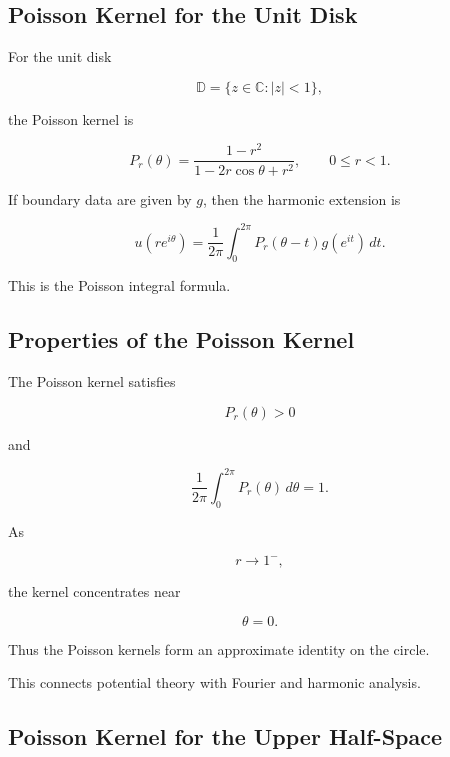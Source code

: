 \subsection{Poisson Kernel for the Unit Disk}
\label{subsec:poisson-kernel-disk}

For the unit disk

\[
\mathbb{D}
=
\{z\in\mathbb{C}:|z|<1\},
\]

the Poisson kernel is

\[
\boxed{
P_r(\theta)
=
\frac{1-r^2}
{1-2r\cos\theta+r^2},
\qquad
0\leq r<1.
}
\]

If boundary data are given by \(g\), then the harmonic extension is

\[
\boxed{
u(re^{i\theta})
=
\frac{1}{2\pi}
\int_0^{2\pi}
P_r(\theta-t)g(e^{it})\,dt.
}
\]

This is the Poisson integral formula.

\subsection{Properties of the Poisson Kernel}
\label{subsec:poisson-kernel-properties}

The Poisson kernel satisfies

\[
\boxed{
P_r(\theta)>0
}
\]

and

\[
\boxed{
\frac{1}{2\pi}
\int_0^{2\pi}
P_r(\theta)\,d\theta
=
1.
}
\]

As

\[
r\to1^-,
\]

the kernel concentrates near

\[
\theta=0.
\]

Thus the Poisson kernels form an approximate identity on the circle.

This connects potential theory with Fourier and harmonic analysis.

\subsection{Poisson Kernel for the Upper Half-Space}
\label{subsec:poisson-kernel-half-space}

